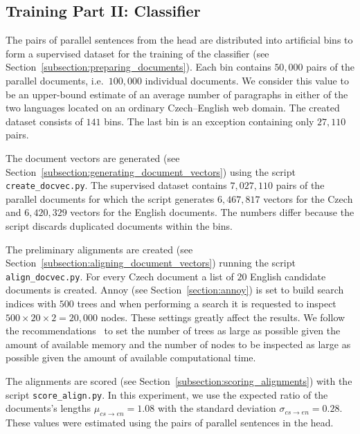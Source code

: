 \subsection{Training Part II: Classifier}
\label{subsection:czeng_experiment_training_2}

The pairs of parallel sentences from the head are distributed into artificial bins to form a supervised dataset for the training of the classifier (see Section~\ref{subsection:preparing_documents}). Each bin contains $50,000$ pairs of the parallel documents, i.e.\ $100,000$ individual documents. We consider this value to be an upper-bound estimate of an average number of paragraphs in either of the two languages located on an ordinary Czech--English web domain. The created dataset consists of $141$ bins. The last bin is an exception containing only $27,110$ pairs.

The document vectors are generated (see Section~\ref{subsection:generating_document_vectors}) using the script \texttt{create\_docvec.py}. The supervised dataset contains $7,027,110$ pairs of the parallel documents for which the script generates $6,467,817$ vectors for the Czech and $6,420,329$ vectors for the English documents. The numbers differ because the script discards duplicated documents within the bins.

The preliminary alignments are created (see Section~\ref{subsection:aligning_document_vectors}) running the script \texttt{align\_docvec.py}. For every Czech document a list of $20$ English candidate documents is created. Annoy (see Section~\ref{section:annoy}) is set to build search indices with $500$ trees and when performing a search it is requested to inspect $500 \times 20 \times 2 = 20,000$ nodes. These settings greatly affect the results. We follow the recommendations~\cite{annoy} to set the number of trees as large as possible given the amount of available memory and the number of nodes to be inspected as large as possible given the amount of available computational time.

The alignments are scored (see Section~\ref{subsection:scoring_alignments}) with the script \texttt{score\_align.py}. In this experiment, we use the expected ratio of the documents's lengths $\mu_{cs \rightarrow en} = 1.08$ with the standard deviation $\sigma_{cs \rightarrow en} = 0.28$. These values were estimated using the pairs of parallel sentences in the head.

